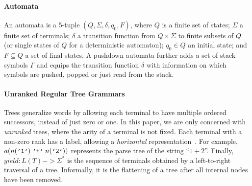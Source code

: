 \documentclass[runningheads]{llncs}
\newcommand{\support}{\mathit{Supp}}
\newcommand{\T}{\Sigma} %
\begin{document}
\paragraph{Automata}
An automata is a 5-tuple $(Q,\T,\delta,q_0,F)$, where $Q$ is a
finite set of states; $\T$ a finite set of terminals; $\delta$ a
transition function from $Q \times \T$ to finite subsets of $Q$
(or single states of $Q$ for a deterministic automaton);
$q_0 \in Q$ an initial state; and $F \subseteq Q$ a set of final
states.
%
A pushdown automata further adds a set of stack symbols $\Gamma$
and equips the transition function $\delta$ with information on
which symbols are pushed, popped or just read from the stack.
%

\paragraph{Unranked Regular Tree Grammars}
Trees generalize words by allowing each terminal to have multiple
ordered successors, instead of just zero or one. In this paper, we
are only concerned with \emph{unranked} trees, where the arity of
a terminal is not fixed.
%
Each terminal with a non-zero rank has a label, allowing a
\emph{horizontal}
representation~\cite{comonTreeAutomataTechniques2007}. For
example, $a(n(\verb|'1'|) \;\verb|'+'|\; n(\verb|'2'|))$ represents
the parse tree of the string ``$1+2$''.
%
Finally, $yield : L(T) -> \T^{*}$ is the sequence of terminals
obtained by a left-to-right traversal of a tree. Informally, it is
the flattening of a tree after all internal nodes have been
removed.




\end{document}
